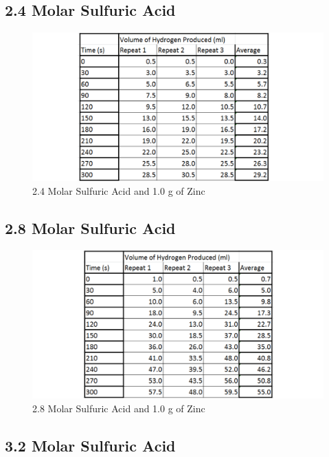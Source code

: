 	\subsection{2.4 Molar Sulfuric Acid}

\begin{figure}[H]
    \includegraphics[width=\textwidth]{./Experiment/Images/1NonCatalyst/24Molar.pdf}
    \caption{2.4 Molar Sulfuric Acid and 1.0 g of Zinc} \label{fig:24MolarSARawData}
\end{figure}

	\subsection{2.8 Molar Sulfuric Acid}

\begin{figure}[H]
    \includegraphics[width=\textwidth]{./Experiment/Images/1NonCatalyst/28Molar.pdf}
    \caption{2.8 Molar Sulfuric Acid and 1.0 g of Zinc} \label{fig:28MolarSARawData}
\end{figure}

	\subsection{3.2 Molar Sulfuric Acid}


